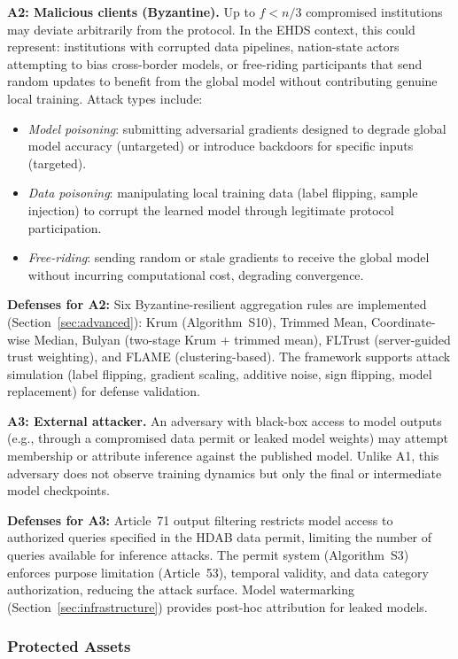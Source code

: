 \documentclass[conference]{IEEEtran}
\begin{document}
\textbf{A2: Malicious clients (Byzantine).} Up to $f < n/3$ compromised institutions may deviate arbitrarily from the protocol. In the EHDS context, this could represent: institutions with corrupted data pipelines, nation-state actors attempting to bias cross-border models, or free-riding participants that send random updates to benefit from the global model without contributing genuine local training. Attack types include:
\begin{itemize}
    \item \textit{Model poisoning}: submitting adversarial gradients designed to degrade global model accuracy (untargeted) or introduce backdoors for specific inputs (targeted).
    \item \textit{Data poisoning}: manipulating local training data (label flipping, sample injection) to corrupt the learned model through legitimate protocol participation.
    \item \textit{Free-riding}: sending random or stale gradients to receive the global model without incurring computational cost, degrading convergence.
\end{itemize}

\textbf{Defenses for A2:} Six Byzantine-resilient aggregation rules are implemented (Section~\ref{sec:advanced}): Krum (Algorithm~S10), Trimmed Mean, Coordinate-wise Median, Bulyan (two-stage Krum + trimmed mean), FLTrust (server-guided trust weighting), and FLAME (clustering-based). The framework supports attack simulation (label flipping, gradient scaling, additive noise, sign flipping, model replacement) for defense validation.

\textbf{A3: External attacker.} An adversary with black-box access to model outputs (e.g., through a compromised data permit or leaked model weights) may attempt membership or attribute inference against the published model. Unlike A1, this adversary does not observe training dynamics but only the final or intermediate model checkpoints.

\textbf{Defenses for A3:} Article~71 output filtering restricts model access to authorized queries specified in the HDAB data permit, limiting the number of queries available for inference attacks. The permit system (Algorithm~S3) enforces purpose limitation (Article~53), temporal validity, and data category authorization, reducing the attack surface. Model watermarking (Section~\ref{sec:infrastructure}) provides post-hoc attribution for leaked models.

\subsubsection{Protected Assets}
\end{document}
